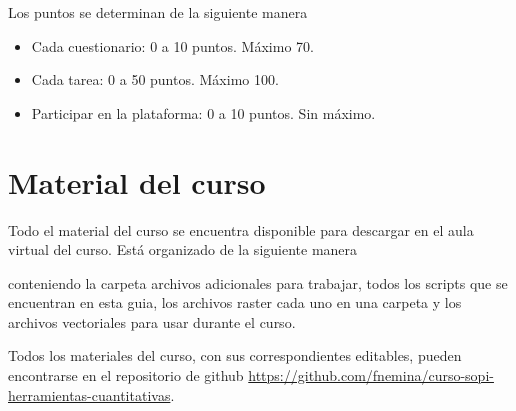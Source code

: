 Los puntos se determinan de la siguiente manera

\begin{itemize}
  \item Cada cuestionario: 0 a 10 puntos. Máximo 70.
  \item Cada tarea: 0 a 50 puntos. Máximo 100.
  \item Participar en la plataforma: 0 a 10 puntos. Sin máximo.
\end{itemize}

\section{Material del curso}
Todo el material del curso se encuentra disponible para descargar en el aula virtual del curso. Est\'a organizado de la siguiente manera


conteniendo la carpeta  archivos adicionales para trabajar,  todos los scripts que se encuentran en esta guia,  los archivos raster cada uno en una carpeta y  los archivos vectoriales para usar durante el curso.

Todos los materiales del curso, con sus correspondientes editables, pueden
encontrarse en el repositorio de github \url{https://github.com/fnemina/curso-sopi-herramientas-cuantitativas}.

